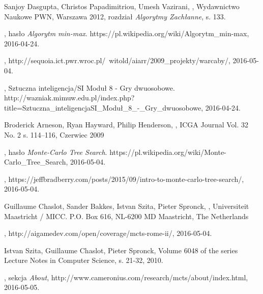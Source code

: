 \documentclass[11pt]{aghdpl}
\begin{document}
\begin{thebibliography}{1}
\bibitem{}
\label{bib:algorytmy_zachlanny}
Sanjoy Dasgupta, Christos Papadimitriou, Umesh Vazirani,
,
\newblock Wydawnictwo Naukowe PWN, Warszawa 2012,
\newblock rozdział {\em Algorytmy Zachłanne}, s. 133.

\bibitem{}
\label{bib:wiki_minMax}
, hasło {\em Algorytm min-max}.
\newblock https://pl.wikipedia.org/wiki/Algorytm\_min-max, 2016-04-24.


\bibitem{}
\label{bib:minMax_warcaby}
,
\newblock http://sequoia.ict.pwr.wroc.pl/~witold/aiarr/2009\_projekty/warcaby/, 2016-05-04.

\bibitem{}
\label{bib:wazniak_minMax}
, Sztuczna inteligencja/SI Moduł 8 - Gry dwuosobowe.
\newblock http://wazniak.mimuw.edu.pl/index.php?title=Sztuczna\_inteligencja\/SI\_Moduł\_8\_-\_Gry\_dwuosobowe, 2016-04-24.

\bibitem{}
\label{bib:mcts_hex}
Broderick Arneson, Ryan Hayward, Philip Henderson,
,
\newblock ICGA Journal Vol. 32 No. 2 s. 114–116, Czerwiec 2009

\bibitem{}
\label{bib:wiki_mcts}
, hasło {\em Monte-Carlo Tree Search}.
\newblock https://pl.wikipedia.org/wiki/Monte-Carlo\_Tree\_Search, 2016-05-04.

\bibitem{}
\label{bib:mcts_wprowadzenie}
,
\newblock https://jeffbradberry.com/posts/2015/09/intro-to-monte-carlo-tree-search/, 2016-05-04.

\bibitem{}
\label{bib:mcts_opis}
Guillaume Chaslot, Sander Bakkes, Istvan Szita, Pieter Spronck,
,
\newblock Universiteit Maastricht / MICC.
\newblock P.O. Box 616, NL-6200 MD Maastricht, The Netherlands

\bibitem{}
\label{bib:mcts_totalWar}
,
\newblock http://aigamedev.com/open/coverage/mcts-rome-ii/, 2016-05-04.

\bibitem{}
\label{bib:mcts_osadnicy}
Istvan Szita, Guillaume Chaslot, Pieter Spronck,
\newblock Volume 6048 of the series Lecture Notes in Computer Science, s. 21-32, 2010.

\bibitem{}
\label{bib:mcts_ucb}
, sekcja {\em About},
\newblock http://www.cameronius.com/research/mcts/about/index.html, 2016-05-05.


\end{thebibliography}
\end{document}
